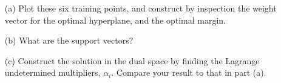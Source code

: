 \documentclass[fleqn]{article}
\begin{document}
\begin{enumerate}
	\begin{enumerate}
		\item[(a)] Plot these six training points, and construct by inspection the weight vector for the optimal hyperplane, and the optimal margin.
		
		\item[(b)] What are the support vectors?
		
		\item[(c)] Construct the solution in the dual space by finding the Lagrange undetermined multipliers, $\alpha_i$. Compare your result to that in \newline part (a).
	\end{enumerate}
	\end{enumerate}
\end{document}
